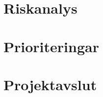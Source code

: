 \documentclass[a4paper,11pt]{article}
\begin{document}
\section{Riskanalys}

\section{Prioriteringar}

\section{Projektavslut}

\begin{appendices}
\end{appendices}
\end{document}
